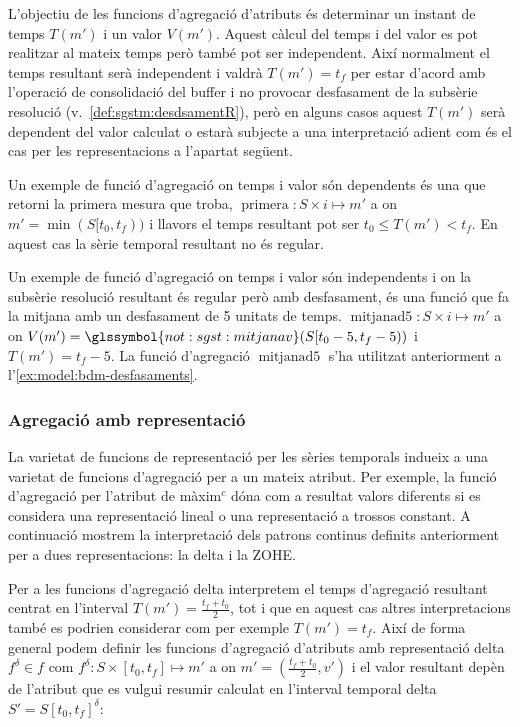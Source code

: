 L'objectiu de les funcions d'agregació d'atributs és determinar un
instant de temps $T(m')$ i un valor $V(m')$. Aquest càlcul del temps i
del valor es pot realitzar al mateix temps però també pot ser
independent. Així normalment el temps resultant serà independent i
valdrà $T(m')=t_f$ per estar d'acord amb l'operació de consolidació
del buffer i no provocar desfasament de la subsèrie resolució
(v.~\autoref{def:sgstm:desdsamentR}), però en alguns casos aquest
$T(m')$ serà dependent del valor calculat o estarà subjecte a una
interpretació adient com és el cas per les representacions a
l'apartat següent.


Un exemple de funció d'agregació on temps i valor són dependents és
una que retorni la primera mesura que troba, $\operatorname{primera}:
S \times i \mapsto m'$ a on $m' = \min(S[t_0,t_f))$ i llavors el temps
resultant pot ser $t_0 \leq T(m') < t_f$. En aquest cas la sèrie
temporal resultant no és regular.


Un exemple de funció d'agregació on temps i valor són independents i
on la subsèrie resolució resultant és regular però amb desfasament, és
una funció que fa la mitjana amb un desfasament de 5 unitats de temps.
$\operatorname{mitjanad5}: S \times i \mapsto m'$ a on $V(m')=
\glssymbol{not:sgst:mitjanav}(S[t_0-5,t_f-5))$ i $T(m')=t_f-5$. La
funció d'agregació $\operatorname{mitjanad5}$ s'ha utilitzat
anteriorment a l'\autoref{ex:model:bdm-desfasaments}.







\subsubsection{Agregació amb representació}

La varietat de funcions de representació per les sèries temporals
indueix a una varietat de funcions d'agregació per a un mateix
atribut. Per exemple, la funció d'agregació per l'atribut de màxim$^c$
dóna com a resultat valors diferents si es considera una representació
lineal o una representació a trossos constant. A continuació mostrem
la interpretació dels patrons continus definits anteriorment per a
dues representacions: la delta i la ZOHE.

Per a les funcions d'agregació delta interpretem el temps d'agregació
resultant centrat en l'interval $T(m')=\frac{t_f+t_0}{2}$, tot i que
en aquest cas altres interpretacions també es podrien considerar com
per exemple $T(m')=t_f$. Així de forma general podem definir les
funcions d'agregació d'atributs amb representació delta $f^\delta\in
f$ com $f^\delta: S \times [t_0,t_f] \mapsto m'$ a on
$m'=(\frac{t_f+t_0}{2},v')$ i el valor resultant depèn de l'atribut
que es vulgui resumir calculat en l'interval temporal delta
$S'=S[t_0,t_f]^\delta$:

